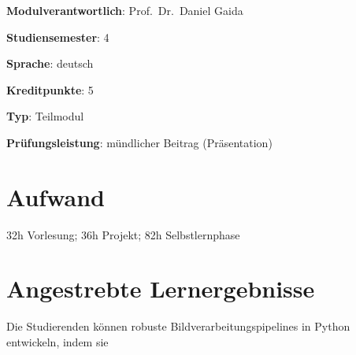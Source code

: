 \begin{modulHead}
\textbf{Modulverantwortlich}: Prof.~Dr.~Daniel
Gaida
\end{modulHead}
\begin{modulHead}
\textbf{Studiensemester}:
4
\end{modulHead}
\begin{modulHead}
\textbf{Sprache}:
deutsch
\end{modulHead}
\begin{modulHead}
\textbf{Kreditpunkte}:
5
\end{modulHead}
\begin{modulHead}
\textbf{Typ}:
Teilmodul
\end{modulHead}
\begin{modulHead}
\textbf{Prüfungsleistung}:
mündlicher Beitrag (Präsentation)
\end{modulHead}


\hypertarget{aufwandpathlabelmi-2017modulbeschreibungen-bachelorba_vc-bildverarbeitung-und-computer-vision}{%
\section*{Aufwand\label{/mi-2017/modulbeschreibungen-bachelor/BA_VC-bildverarbeitung-und-computer-vision}}\label{aufwandpathlabelmi-2017modulbeschreibungen-bachelorba_vc-bildverarbeitung-und-computer-vision}}

32h Vorlesung; 36h Projekt; 82h Selbstlernphase

\hypertarget{angestrebte-lernergebnissepathlabelmi-2017modulbeschreibungen-bachelorba_vc-bildverarbeitung-und-computer-vision}{%
\section*{Angestrebte
Lernergebnisse\label{/mi-2017/modulbeschreibungen-bachelor/BA_VC-bildverarbeitung-und-computer-vision}}\label{angestrebte-lernergebnissepathlabelmi-2017modulbeschreibungen-bachelorba_vc-bildverarbeitung-und-computer-vision}}

Die Studierenden können robuste Bildverarbeitungspipelines in Python
entwickeln, indem sie

